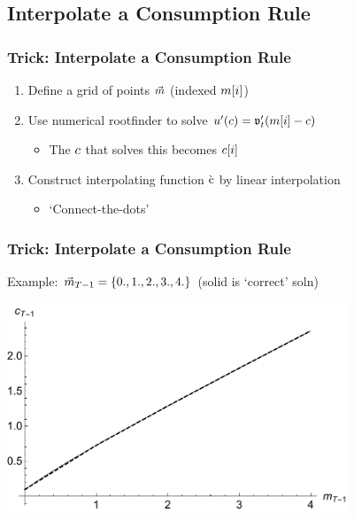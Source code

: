 \documentclass{beamer}
\begin{document}
\subsection{Interpolate a Consumption Rule}
\begin{frame}
\frametitle{Trick: Interpolate a Consumption Rule}

\begin{enumerate}
\item Define a grid of points $\vec{m}$ (indexed $m[i]$)
\item Use numerical rootfinder to solve 
$u^{\prime}(c) = \mathfrak{v}^{\prime}_{t}(m[i]-c)$
\begin{itemize}
\item The $c$ that solves this becomes $c[i]$
\end{itemize}
\item Construct interpolating function $\grave{\mathrm{c}}$ by linear interpolation
\begin{itemize}
\item `Connect-the-dots'
\end{itemize}
\end{enumerate}

\end{frame}






\begin{frame}[label=DiscretizeEqn]
\frametitle{Trick: Interpolate a Consumption Rule}

Example: $\vec{m}_{T-1} = \{0.,1.,2.,3.,4.\}$ (solid is `correct' soln)

\includegraphics[width=4.0in]{./Figures/PlotcTm1Simple.pdf}

\end{frame}
\end{document}
